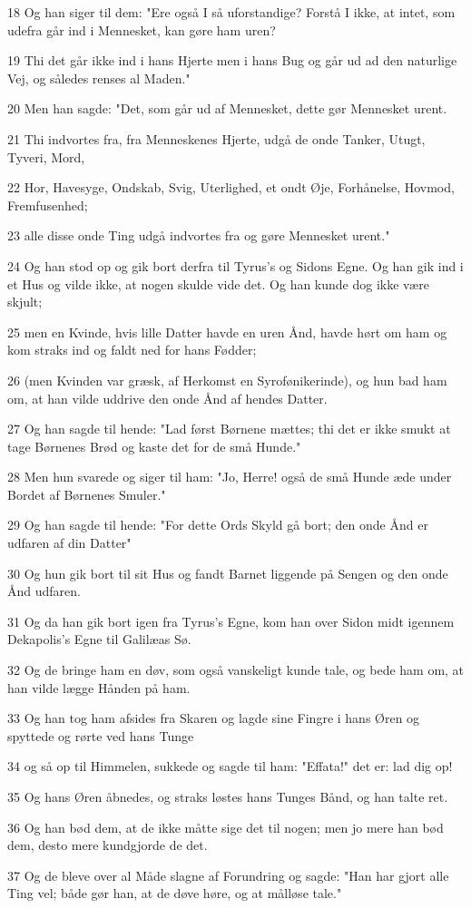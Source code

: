 \par 18 Og han siger til dem: "Ere også I så uforstandige? Forstå I ikke, at intet, som udefra går ind i Mennesket, kan gøre ham uren?
\par 19 Thi det går ikke ind i hans Hjerte men i hans Bug og går ud ad den naturlige Vej, og således renses al Maden."
\par 20 Men han sagde: "Det, som går ud af Mennesket, dette gør Mennesket urent.
\par 21 Thi indvortes fra, fra Menneskenes Hjerte, udgå de onde Tanker, Utugt, Tyveri, Mord,
\par 22 Hor, Havesyge, Ondskab, Svig, Uterlighed, et ondt Øje, Forhånelse, Hovmod, Fremfusenhed;
\par 23 alle disse onde Ting udgå indvortes fra og gøre Mennesket urent."
\par 24 Og han stod op og gik bort derfra til Tyrus's og Sidons Egne. Og han gik ind i et Hus og vilde ikke, at nogen skulde vide det. Og han kunde dog ikke være skjult;
\par 25 men en Kvinde, hvis lille Datter havde en uren Ånd, havde hørt om ham og kom straks ind og faldt ned for hans Fødder;
\par 26 (men Kvinden var græsk, af Herkomst en Syrofønikerinde), og hun bad ham om, at han vilde uddrive den onde Ånd af hendes Datter.
\par 27 Og han sagde til hende: "Lad først Børnene mættes; thi det er ikke smukt at tage Børnenes Brød og kaste det for de små Hunde."
\par 28 Men hun svarede og siger til ham: "Jo, Herre! også de små Hunde æde under Bordet af Børnenes Smuler."
\par 29 Og han sagde til hende: "For dette Ords Skyld gå bort; den onde Ånd er udfaren af din Datter"
\par 30 Og hun gik bort til sit Hus og fandt Barnet liggende på Sengen og den onde Ånd udfaren.
\par 31 Og da han gik bort igen fra Tyrus's Egne, kom han over Sidon midt igennem Dekapolis's Egne til Galilæas Sø.
\par 32 Og de bringe ham en døv, som også vanskeligt kunde tale, og bede ham om, at han vilde lægge Hånden på ham.
\par 33 Og han tog ham afsides fra Skaren og lagde sine Fingre i hans Øren og spyttede og rørte ved hans Tunge
\par 34 og så op til Himmelen, sukkede og sagde til ham: "Effata!" det er: lad dig op!
\par 35 Og hans Øren åbnedes, og straks løstes hans Tunges Bånd, og han talte ret.
\par 36 Og han bød dem, at de ikke måtte sige det til nogen; men jo mere han bød dem, desto mere kundgjorde de det.
\par 37 Og de bleve over al Måde slagne af Forundring og sagde: "Han har gjort alle Ting vel; både gør han, at de døve høre, og at målløse tale."

